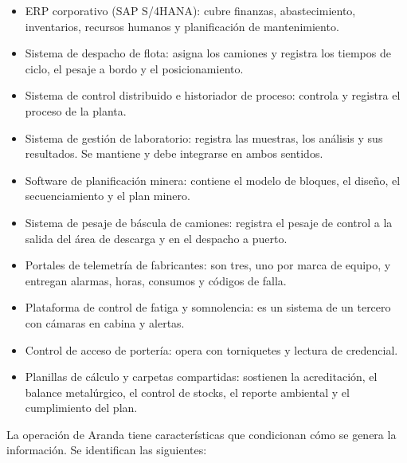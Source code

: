 \documentclass[anexo]{../../comun/overfore}
\begin{document}
\begin{itemize}
\item ERP corporativo (SAP S/4HANA): cubre finanzas, abastecimiento, inventarios, recursos humanos y planificación de mantenimiento.
\item Sistema de despacho de flota: asigna los camiones y registra los tiempos de ciclo, el pesaje a bordo y el posicionamiento.
\item Sistema de control distribuido e historiador de proceso: controla y registra el proceso de la planta.
\item Sistema de gestión de laboratorio: registra las muestras, los análisis y sus resultados. Se mantiene y debe integrarse en ambos sentidos.
\item Software de planificación minera: contiene el modelo de bloques, el diseño, el secuenciamiento y el plan minero.
\item Sistema de pesaje de báscula de camiones: registra el pesaje de control a la salida del área de descarga y en el despacho a puerto.
\item Portales de telemetría de fabricantes: son tres, uno por marca de equipo, y entregan alarmas, horas, consumos y códigos de falla.
\item Plataforma de control de fatiga y somnolencia: es un sistema de un tercero con cámaras en cabina y alertas.
\item Control de acceso de portería: opera con torniquetes y lectura de credencial.
\item Planillas de cálculo y carpetas compartidas: sostienen la acreditación, el balance metalúrgico, el control de stocks, el reporte ambiental y el cumplimiento del plan.
\end{itemize}

La operación de Aranda tiene características que condicionan cómo se genera la información. Se identifican las siguientes:
\end{document}
